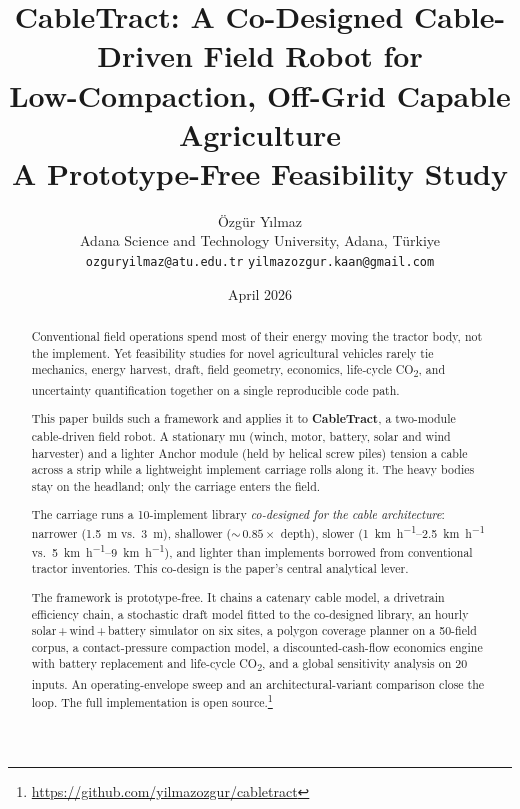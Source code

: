 \documentclass[11pt,a4paper]{article}
\title{\textbf{CableTract: A Co-Designed Cable-Driven Field Robot for\\
Low-Compaction, Off-Grid Capable Agriculture}\\[0.4em]
\large A Prototype-Free Feasibility Study}
\author{Özgür Yılmaz\\[0.3em]
\normalsize Adana Science and Technology University, Adana, Türkiye\\[0.15em]
\normalsize \texttt{ozguryilmaz@atu.edu.tr} \quad \texttt{yilmazozgur.kaan@gmail.com}}
\date{April 2026}
\newcommand{\cabletractrepo}{\url{https://github.com/yilmazozgur/cabletract}}
\begin{document}
\maketitle

\begin{abstract}
\noindent
Conventional field operations spend most of their energy moving the tractor body, not the implement. Yet feasibility studies for novel agricultural vehicles rarely tie mechanics, energy harvest, draft, field geometry, economics, life-cycle CO\textsubscript{2}, and uncertainty quantification together on a single reproducible code path.

This paper builds such a framework and applies it to \textbf{CableTract}, a two-module cable-driven field robot. A stationary \gls{mu} (winch, motor, battery, solar and wind harvester) and a lighter Anchor module (held by helical screw piles) tension a cable across a strip while a lightweight implement carriage rolls along it. The heavy bodies stay on the headland; only the carriage enters the field.

The carriage runs a 10-implement library \emph{co-designed for the cable architecture}: narrower (\SI{1.5}{\meter} vs.\ \SI{3}{\meter}), shallower (${\sim}\,0.85\times$ depth), slower (\SIrange{1}{2.5}{\kilo\meter\per\hour} vs.\ \SIrange{5}{9}{\kilo\meter\per\hour}), and lighter than implements borrowed from conventional tractor inventories. This co-design is the paper's central analytical lever.

\medskip
The framework is prototype-free. It chains a catenary cable model, a drivetrain efficiency chain, a stochastic draft model fitted to the co-designed library, an hourly solar\,+\,wind\,+\,battery simulator on six sites, a polygon coverage planner on a 50-field corpus, a contact-pressure compaction model, a discounted-cash-flow economics engine with battery replacement and life-cycle CO\textsubscript{2}, and a global sensitivity analysis on 20 inputs. An operating-envelope sweep and an architectural-variant comparison close the loop. The full implementation is open source.\footnote{\cabletractrepo}


\end{abstract}
\end{document}
